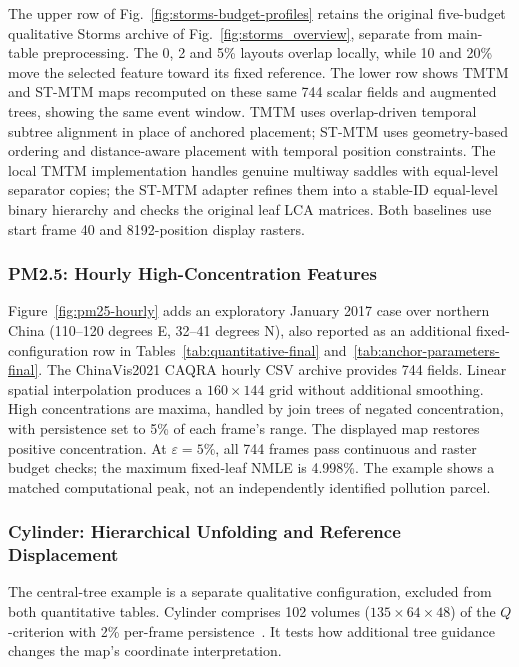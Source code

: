 \documentclass[review]{vgtc}
\begin{document}
The upper row of Fig.~\ref{fig:storms-budget-profiles} retains the original five-budget qualitative Storms archive of Fig.~\ref{fig:storms_overview}, separate from main-table preprocessing. The 0, 2 and 5\% layouts overlap locally, while 10 and 20\% move the selected feature toward its fixed reference. The lower row shows TMTM and ST-MTM maps recomputed on these same 744 scalar fields and augmented trees, showing the same event window. TMTM uses overlap-driven temporal subtree alignment in place of anchored placement; ST-MTM uses geometry-based ordering and distance-aware placement with temporal position constraints. The local TMTM implementation handles genuine multiway saddles with equal-level separator copies; the ST-MTM adapter refines them into a stable-ID equal-level binary hierarchy and checks the original leaf LCA matrices. Both baselines use start frame 40 and 8192-position display rasters. 


\subsubsection{PM2.5: Hourly High-Concentration Features}
Figure~\ref{fig:pm25-hourly} adds an exploratory January 2017 case over northern China (110--120 degrees E, 32--41 degrees N), also reported as an additional fixed-configuration row in Tables~\ref{tab:quantitative-final} and~\ref{tab:anchor-parameters-final}. The ChinaVis2021 CAQRA hourly CSV archive provides 744 fields. Linear spatial interpolation produces a $160\times144$ grid without additional smoothing. High concentrations are maxima, handled by join trees of negated concentration, with persistence set to 5\% of each frame's range. The displayed map restores positive concentration. At $\varepsilon=5\%$, all 744 frames pass continuous and raster budget checks; the maximum fixed-leaf NMLE is 4.998\%. The example shows a matched computational peak, not an independently identified pollution parcel.


\subsubsection{Cylinder: Hierarchical Unfolding and Reference Displacement}\label{sec:centered-volume}

The central-tree example is a separate qualitative configuration, excluded from both quantitative tables. Cylinder comprises 102 volumes ($135\times64\times48$) of the $Q$-criterion with 2\% per-frame persistence~\cite{Camarri:2005:Cylinder,Weinkauf:SquareCylinder}. It tests how additional tree guidance changes the map's coordinate interpretation.
\end{document}

